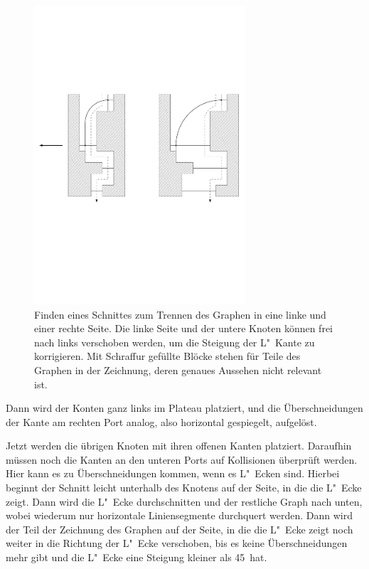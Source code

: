 \documentclass[a4paper]{scrreprt}
\theoremstyle{definition}
\begin{document}
\begin{figure}[h]
  \centering
  \includegraphics[width=0.7\textwidth]{cut_L_slope_correction}
  \caption{Finden eines Schnittes zum Trennen des Graphen in eine linke und einer rechte Seite. Die linke Seite und der untere Knoten können frei nach links verschoben werden, um die Steigung der L"~Kante zu korrigieren. Mit Schraffur gefüllte Blöcke stehen für Teile des Graphen in der Zeichnung, deren genaues Aussehen nicht relevant ist.}
  \label{fig:cutLslopecorrection}
\end{figure}

Dann wird der Konten ganz links im Plateau platziert, und die Überschneidungen der Kante am rechten Port analog, also horizontal gespiegelt, aufgelöst.

Jetzt werden die übrigen Knoten mit ihren offenen Kanten platziert. Daraufhin müssen noch die Kanten an den unteren Ports auf Kollisionen überprüft werden. Hier kann es zu Überschneidungen kommen, wenn es L"~Ecken sind. Hierbei beginnt der Schnitt leicht unterhalb des Knotens auf der Seite, in die die L"~Ecke zeigt. Dann wird die L"~Ecke durchschnitten und der restliche Graph nach unten, wobei wiederum nur horizontale Liniensegmente durchquert werden. Dann wird der Teil der Zeichnung des Graphen auf der Seite, in die die L"~Ecke zeigt noch weiter in die Richtung der L"~Ecke verschoben, bis es keine Überschneidungen mehr gibt und die L"~Ecke eine Steigung kleiner als 45\textdegree\ hat.
\end{document}
